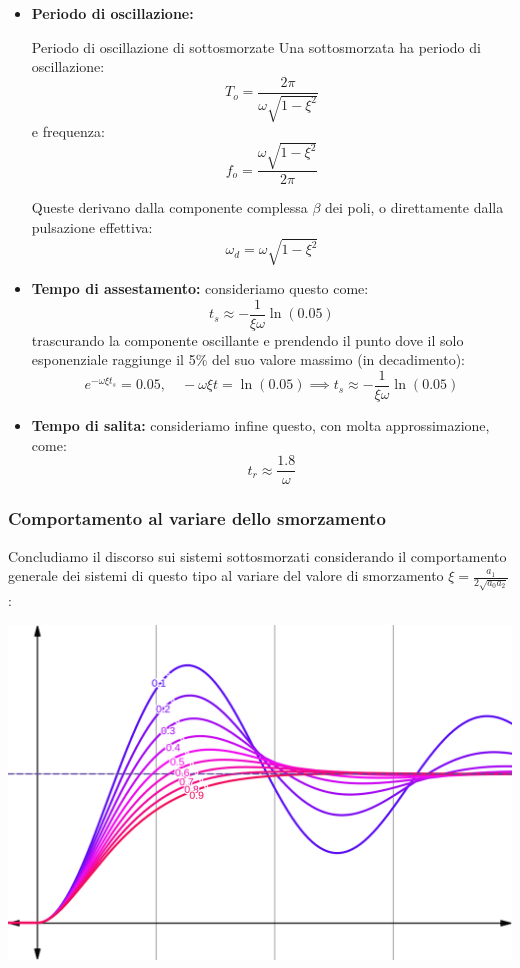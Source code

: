 \documentclass[a4paper,11pt]{article}
\begin{document}
\begin{itemize}
		Prendendo il valore di $y(t)$ in $t_p$ si ha che resta solo il coseno, cioè:
		$$
		y(t_p) = G(0) \cdot (1 + e^{\xi \omega t_p})
		$$
		da cui $e^{\xi \omega t_p}$ rappresenta la frazione di surplus al punto di massimo sovraelongamento, che moltiplichiamo per 100 per portare in percentuale. \qed
	\item \textbf{Periodo di oscillazione:}
		\begin{theorem}{Periodo di oscillazione di sottosmorzate}
		Una sottosmorzata ha periodo di oscillazione:
			$$
			T_o = \frac{2\pi}{\omega \sqrt{1 - \xi^2}}
		$$
		e frequenza:
		$$
			f_o = \frac{\omega \sqrt{1 - \xi^2}}{2\pi} 
		$$
		\end{theorem}
		Queste derivano dalla componente complessa $\beta$ dei poli, o direttamente dalla pulsazione effettiva:
		$$
		\omega_d = \omega \sqrt{1 - \xi^2}
		$$
	\item \textbf{Tempo di assestamento:} consideriamo questo come:
		$$
		t_s \approx -\frac{1}{\xi \omega} \ln(0.05)
		$$
		trascurando la componente oscillante e prendendo il punto dove il solo esponenziale raggiunge il 5\% del suo valore massimo (in decadimento):
		$$
		e^{-\omega \xi t_s} = 0.05, \quad -\omega \xi t = \ln (0.05) \implies t_s \approx -\frac{1}{\xi \omega} \ln(0.05)
		$$
	\item \textbf{Tempo di salita:} consideriamo infine questo, con molta approssimazione, come:
		$$
		t_r \approx \frac{1.8}{\omega}
		$$
\end{itemize}

\subsubsection{Comportamento al variare dello smorzamento}
\noindent
\begin{minipage}{\textwidth}
Concludiamo il discorso sui sistemi sottosmorzati considerando il comportamento generale dei sistemi di questo tipo al variare del valore di smorzamento $\xi = \frac{a_1}{2 \sqrt{a_0 a_2}}$:

\par\bigskip

\begin{center}
\includegraphics[scale=0.29]{../figures/damping_values.png}
\end{center}
\end{minipage}
\end{document}
